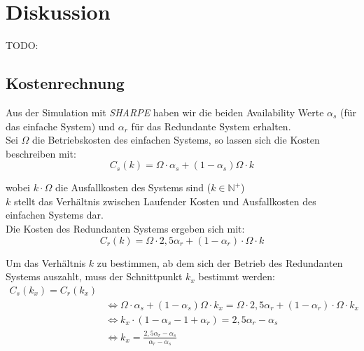 \documentclass[
            a4paper
            ]{scrartcl}%
\begin{document}
\section{Diskussion}
TODO:
\subsection{Kostenrechnung}
Aus der Simulation mit \emph{SHARPE} haben wir die beiden Availability Werte $\alpha_s$ (für das einfache System) und $\alpha_r$ für das Redundante System erhalten.\\
Sei $\Omega$ die Betriebskosten des einfachen Systems, so lassen sich die Kosten beschreiben mit:
\begin{equation}
C_s(k) = \Omega \cdot \alpha_s + (1-\alpha_s)\Omega \cdot k
\end{equation}

wobei $k \cdot \Omega$ die Ausfallkosten des Systems sind ($k \in \mathbb{N}^+$)\\$k$ stellt das Verhältnis zwischen Laufender Kosten und Ausfallkosten des einfachen Systems dar.\\
Die Kosten des Redundanten Systems ergeben sich mit: 
\begin{equation}
C_r(k) = \Omega \cdot 2,5 \alpha_r + (1- \alpha_r) \cdot \Omega \cdot k
\end{equation}

Um das Verhältnis $k$ zu bestimmen, ab dem sich der Betrieb des Redundanten Systems auszahlt, muss der Schnittpunkt $k_x$ bestimmt werden:
\begin{equation}
\begin{split}
C_s(k_x) = C_r(k_x) \\ &
 \Leftrightarrow
\Omega \cdot \alpha_s + (1-\alpha_s)\Omega \cdot k_x = \Omega \cdot 2,5 \alpha_r + (1- \alpha_r) \cdot \Omega \cdot k_x \\ & \Leftrightarrow
k_x \cdot (1 - \alpha_s - 1 + \alpha_r) = 2,5 \alpha_r - \alpha_s \\ & \Leftrightarrow
k_x = \frac{2,5 \alpha_r - \alpha_s}{\alpha_r - \alpha_s}
\end{split}
\end{equation}
\end{document}
